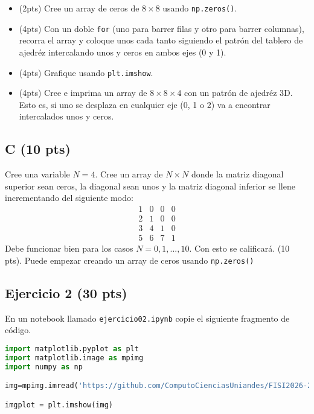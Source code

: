 \documentclass{article}
\begin{document}
\begin{itemize}
\item (2pts) Cree un array de ceros de $8 \times 8$ usando \texttt{np.zeros()}.
\item (4pts) Con un doble \texttt{for} (uno para barrer filas y otro para barrer columnas),
  recorra el array y coloque unos cada tanto siguiendo el patrón del tablero de ajedréz
  intercalando unos y ceros en ambos ejes (0 y 1).
\item (4pts) Grafique usando \texttt{plt.imshow}.
\item (4pts) Cree e imprima un array de $8 \times 8 \times 4$ con un patrón de ajedréz 3D. Esto es,
  si uno se desplaza en cualquier eje (0, 1 o 2) va a encontrar intercalados unos y ceros.
\end{itemize}

\subsection{C (10 pts)}
Cree una variable $N=4$.
Cree un array de $N \times N$ donde la matriz diagonal superior sean ceros, la diagonal
sean unos y la matriz diagonal inferior se llene incrementando del siguiente modo:
\begin{equation}
  \begin{array}{cccc}
    1 & 0 & 0 & 0 \\
    2 & 1 & 0 & 0 \\
    3 & 4 & 1 & 0 \\
    5 & 6 & 7 & 1
  \end{array}  
\end{equation}
Debe funcionar bien para los casos $N=0, 1, ..., 10$. Con esto se calificará. (10 pts).
Puede empezar creando un array de ceros usando \texttt{np.zeros()}

\subsection{Ejercicio 2 (30 pts)}
En un notebook llamado \texttt{ejercicio02.ipynb} copie el siguiente fragmento de código.

\begin{lstlisting}[language=Python, caption=grafica-cos.py]
import matplotlib.pyplot as plt
import matplotlib.image as mpimg
import numpy as np

img=mpimg.imread('https://github.com/ComputoCienciasUniandes/FISI2026-201910/raw/master/Talleres/Grupo_1/sorpresa_hubble.png')

imgplot = plt.imshow(img)
\end{lstlisting}
\end{document}
